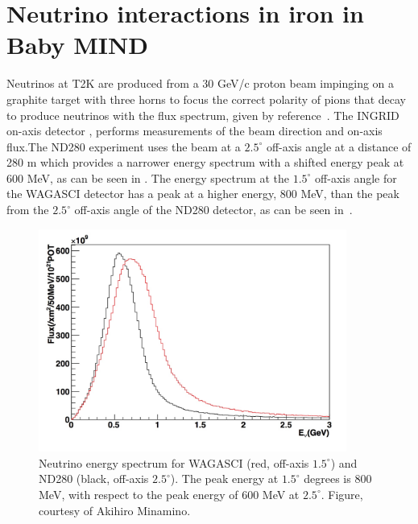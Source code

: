 \section{Neutrino interactions in iron in Baby MIND}

Neutrinos at T2K are produced from a 30 GeV/c proton beam impinging on a graphite target with three horns to focus the correct polarity of pions that decay to produce neutrinos with the flux spectrum, given by reference~\cite{119T2K}. The INGRID on-axis detector \cite{120INGRID}, performs measurements of the beam direction and on-axis flux.The ND280 experiment uses the beam at a $2.5^\circ$ off-axis angle at a distance of 280 m which provides a narrower energy spectrum with a shifted energy peak at 600 MeV, as can be seen in . The energy spectrum at the $1.5^\circ$ off-axis angle for the WAGASCI detector has a peak at a higher energy, 800 MeV, than the peak from the $2.5^\circ$ off-axis angle of the ND280 detector, as can be seen in~. 




\begin{figure}[h!]
\centering
\includegraphics[width=0.9\textwidth]{figures/NeutrinoChap/ND280vsWAGASCIspectrum.jpeg}
\caption{Neutrino energy spectrum for WAGASCI (red, off-axis $1.5^\circ$) and ND280 (black, off-axis $2.5^\circ$). The peak energy at $1.5^\circ$ degrees is 800 MeV, with respect to the peak energy of 600 MeV at $2.5^\circ$. Figure, courtesy of Akihiro Minamino.}
\label{fig:T2KAxis}
\end{figure}

